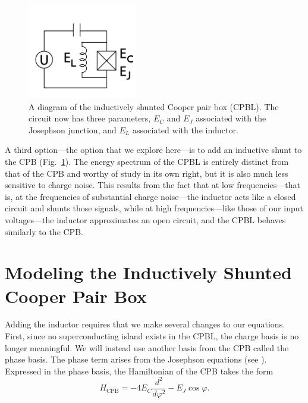 \documentclass[twocolumn]{revtex4}
\begin{document}
\begin{figure}
  \includegraphics[width=.5\linewidth]{CPBL-circuit.png}
  \caption{ A diagram of the inductively shunted Cooper pair box
    (CPBL). The circuit now has three parameters, $E_C$ and $E_J$
    associated with the Josephson junction, and $E_L$ associated with
    the inductor.}
  \label{CPBL-circuit}
\end{figure}

A third option---the option that we explore here---is to add an
inductive shunt to the CPB (Fig.~\ref{CPBL-circuit}). The energy
spectrum of the CPBL is entirely distinct from that of the CPB and
worthy of study in its own right, but it is also much less sensitive
to charge noise. This results from the fact that at low
frequencies---that is, at the frequencies of substantial charge
noise---the inductor acts like a closed circuit and shunts those
signals, while at high frequencies---like those of our input
voltages---the inductor approximates an open circuit, and the CPBL
behaves similarly to the CPB.

\section{Modeling the Inductively Shunted Cooper Pair Box}

Adding the inductor requires that we make several changes to our
equations. First, since no superconducting island exists in the CPBL,
the charge basis is no longer meaningful. We will instead use another
basis from the CPB called the phase basis. The phase term arises from
the Josephson equations (see \cite{Feynman}). Expressed in the phase
basis, the Hamiltonian of the CPB takes the form
\begin{equation}
  H_{\text{CPB}} = -4E_C\frac{d^2}{d\varphi^2}-E_J\cos{\varphi}.
\end{equation}
\end{document}
